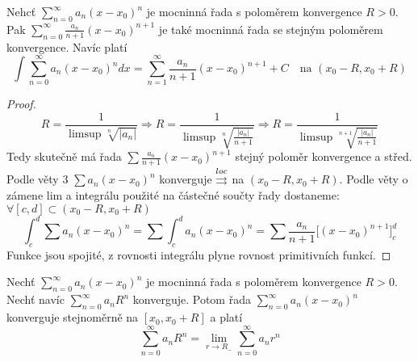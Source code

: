 \begin{vetal}
Nehcť $\sum_{n=0}^{\infty} a_n (x-x_0)^n$ je mocninná řada s poloměrem konvergence $R > 0$. Pak $\sum_{n=0}^{\infty} \frac{a_n}{n+1} \left(x-x_0 \right)^{n+1}$ je také mocninná řada se stejným poloměrem konvergence. Navíc platí
$$\int \sum_{n=0}^{\infty} a_n (x-x_0)^n dx = \sum_{n=1}^{\infty} \frac{a_n}{n+1} \left( x-x_0 \right)^{n+1} + C  \quad \textrm{na } \left( x_0 - R, x_0 + R \right)$$
\end{vetal}

\begin{proof}
$$R = \frac{1}{\limsup \sqrt[n]{|a_n|}} \Rightarrow R = \frac{1}{\limsup \sqrt[n]{ \frac{|a_n|}{n+1}}} \Rightarrow R = \frac{1}{\limsup \sqrt[n+1]{ \frac {|a_n|}{n+1}}}$$
Tedy skutečně má řada $\sum \frac{a_n}{n+1}(x-x_0)^{n+1}$ stejný poloměr konvergence a střed.
Podle věty 3 $\sum a_n (x-x_0)^n $ konverguje $\overset{loc}{\rightrightarrows}$ na $(x_0-R, x_0+R)$.
Podle věty o zámene lim a integrálu použité na částečné součty řady dostaneme: $\forall [c,d] \subset (x_0-R,x_0+R) $
$$\int_c^d \sum a_n(x-x_0)^n = \sum \int_c^d a_n(x-x_0)^n = \sum \frac{a_n}{n+1} \big[ (x-x_0)^{n+1} \big]_c^d $$
Funkce jsou spojité, z rovnosti integrálu plyne rovnost primitivních funkcí.
\end{proof}

\begin{vetat}[Abelova]
Nechť $\sum_{n=0}^{\infty} a_n (x-x_0)^n$ je mocninná řada s poloměrem konvergence $R > 0$. Nechť navíc $\sum_{n=0}^{\infty} a_n R^n$ konverguje. Potom řada $\sum_{n=0}^{\infty} a_n (x-x_0)^n$ konverguje stejnoměrně na $[ x_0, x_0 + R ]$ a platí
$$\sum_{n=0}^{\infty} a_n R^n = \lim_{r \rightarrow R_-} \sum_{n=0}^{\infty} a_n r^n$$
\end{vetat}

